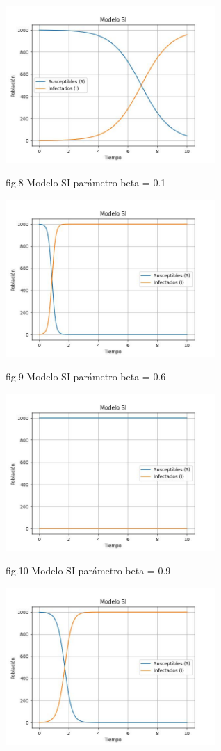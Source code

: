    \begin{center}
        
    \includegraphics[width=0.6\textwidth]{images/plt02.jpg}
    \begin{center}
        fig.8 Modelo SI parámetro beta = 0.1
    \end{center} 
    \includegraphics[width=0.6\textwidth]{images/plt12.jpg}
    \begin{center}
        fig.9 Modelo SI parámetro beta = 0.6
    \end{center} 
    \includegraphics[width=0.6\textwidth]{images/plt22.jpg}
    \begin{center}
        fig.10 Modelo SI parámetro beta = 0.9
    \end{center} 
    \includegraphics[width=0.6\textwidth]{images/plt32.jpg}

\end{center}
